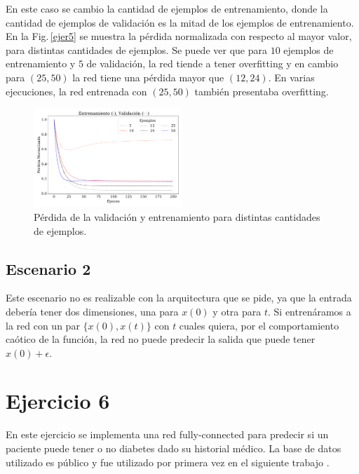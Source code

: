     En este caso se cambio la cantidad de ejemplos de entrenamiento, donde la cantidad de ejemplos de validación es la mitad de los ejemplos de entrenamiento. En la Fig.\,\ref{ejer5} se muestra la pérdida normalizada con respecto al mayor valor, para distintas cantidades de ejemplos. Se puede ver que para $10$ ejemplos de entrenamiento y $5$ de validación, la red tiende a tener overfitting y en cambio para $(25,50)$ la red tiene una pérdida mayor que $(12, 24)$. En  varias ejecuciones, la red entrenada con $(25,50)$ también presentaba overfitting.

    \begin{figure}[H]
        \begin{small}
            \begin{center}
                \includegraphics[width=0.5\textwidth]{Graphs/ejer5_los_gen.pdf}
            \end{center}
            \caption{Pérdida de la validación y entrenamiento para distintas cantidades de ejemplos.}
            \label{fig:ejer5}
        \end{small}
    \end{figure}


    \subsection*{Escenario 2}
    Este escenario no es realizable con la arquitectura que se pide, ya que la entrada debería tener dos dimensiones, una para $x(0)$ y otra para $t$.  Si entrenáramos a la red con un par $\{x(0), x(t)\}$ con $t$ cuales quiera, por el comportamiento caótico de la función, la red no puede predecir la salida que puede tener $x(0) + \epsilon$.

\section*{Ejercicio 6}

    En este ejercicio se implementa una red fully-connected para predecir si un paciente puede tener o no diabetes dado su historial médico. La base de datos utilizado es público y fue utilizado por primera vez en el siguiente trabajo \cite{pima}.

